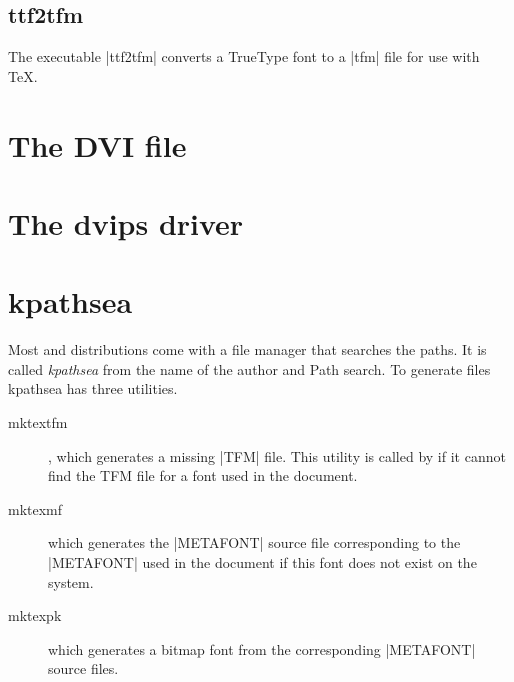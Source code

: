 \begin{multicols}{2}
\subsection{ttf2tfm}
The executable |ttf2tfm| converts a TrueType font to a |tfm| file for use with TeX.






\section{The DVI file}


\section{The dvips driver}


\section{kpathsea}
Most \tex and \latex distributions come with a file manager that searches the paths. It is called \textit{kpathsea} from the name of the author  and Path search.  To generate files kpathsea has three utilities.

\begin{description}
\item[mktextfm]  , which generates a missing |TFM| file. This utility is called by \tex if it cannot find the TFM file for a font used in the document.

\item[mktexmf] which generates the |METAFONT| source file corresponding to the |METAFONT| used in the document if this font does not exist on the system.

\item[mktexpk] which generates a bitmap font from the corresponding |METAFONT| source files.

\end{description}

\end{multicols}

\clearpage



